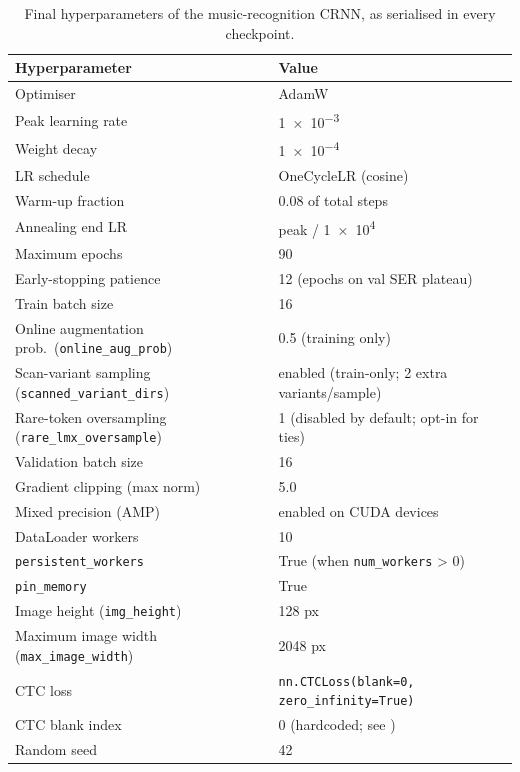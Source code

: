 \begin{table}[H]
\centering\small
\setlength{\tabcolsep}{5pt}
\renewcommand{\arraystretch}{1.30}
\begin{tabularx}{\textwidth}{@{} L l @{}}
\toprule
\textbf{Hyperparameter} & \textbf{Value} \\
\midrule
Optimiser                      & AdamW \\
Peak learning rate              & \num{1e-3} \\
Weight decay                    & \num{1e-4} \\
LR schedule                     & OneCycleLR (cosine) \\
Warm-up fraction                & 0.08 of total steps \\
Annealing end LR                & peak / \num{1e4} \\
Maximum epochs                  & 90 \\
Early-stopping patience         & 12 (epochs on val SER plateau) \\
Train batch size                & 16 \\
Online augmentation prob.\ (\texttt{online\_aug\_prob}) & 0.5 (training only) \\
Scan-variant sampling (\texttt{scanned\_variant\_dirs}) & enabled (train-only; 2 extra variants/sample) \\
Rare-token oversampling (\texttt{rare\_lmx\_oversample}) & 1 (disabled by default; opt-in for ties) \\
Validation batch size           & 16 \\
Gradient clipping (max norm)    & 5.0 \\
Mixed precision (AMP)           & enabled on CUDA devices \\
DataLoader workers              & 10 \\
\texttt{persistent\_workers}    & True (when \texttt{num\_workers} > 0) \\
\texttt{pin\_memory}            & True \\
Image height (\texttt{img\_height})       & 128 px \\
Maximum image width (\texttt{max\_image\_width}) & 2048 px \\
CTC loss                        & \texttt{nn.CTCLoss(blank=0, zero\_infinity=True)} \\
CTC blank index                 & 0 (hardcoded; see ) \\
Random seed                     & 42 \\
\bottomrule
\end{tabularx}
\caption{Final hyperparameters of the music-recognition CRNN, as serialised in every checkpoint.}
\label{tab:hyperparams-omr}
\end{table}

